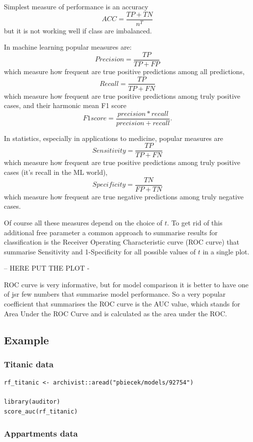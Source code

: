 \documentclass[12pt,]{krantz}
\begin{document}
Simplest measure of performance is an accuracy
\[
ACC = \frac{TP+TN}{n^T}
\]
but it is not working well if class are imbalanced.

In machine learning popular measures are:
\[
Precision = \frac{TP}{TP + FP}
\]
which measure how frequent are true positive predictions among all predictions,
\[
Recall = \frac{TP}{TP + FN}
\]
which measure how frequent are true positive predictions among truly positive cases, and their harmonic mean F1 score
\[
F1 score = \frac{precision * recall}{precision + recall}.
\]

In statistics, especially in applications to medicine, popular measures are
\[
Sensitivity = \frac{TP}{TP + FN}
\]
which measure how frequent are true positive predictions among truly positive cases (it's recall in the ML world),
\[
Specificity = \frac{TN}{FP + TN}
\]
which measure how frequent are true negative predictions among truly negative cases.

Of course all these measures depend on the choice of \(t\). To get rid of this additional free parameter a common approach to summarise results for classification is the Receiver Operating Characteristic curve (ROC curve) that summarise Sensitivity and 1-Specificity for all possible values of \(t\) in a single plot.

-- HERE PUT THE PLOT -

ROC curve is very informative, but for model comparison it is better to have one of jsr few numbers that summarise model performance. So a very popular coefficient that summarises the ROC curve is the AUC value, which stands for Area Under the ROC Curve and is calculated as the area under the ROC.

\hypertarget{example}{%
\subsection{Example}\label{example}}

\hypertarget{modelPerformanceTitanic}{%
\subsubsection{Titanic data}\label{modelPerformanceTitanic}}

\begin{verbatim}
rf_titanic <- archivist::aread("pbiecek/models/92754")

library(auditor)
score_auc(rf_titanic)
\end{verbatim}

\hypertarget{modelPerformanceApartments}{%
\subsubsection{Appartments data}\label{modelPerformanceApartments}}
\end{document}
